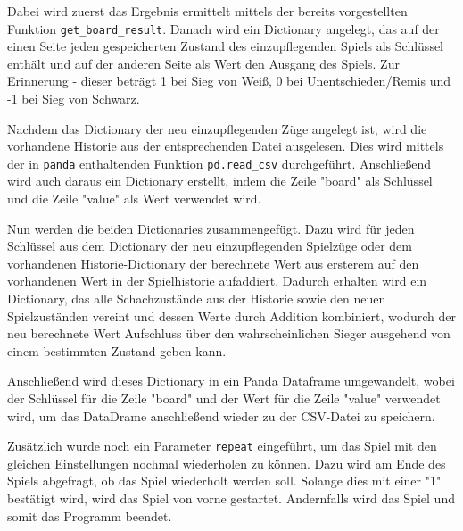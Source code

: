     Dabei wird zuerst das Ergebnis ermittelt mittels der bereits
vorgestellten Funktion \texttt{get\_board\_result}. Danach wird ein
Dictionary angelegt, das auf der einen Seite jeden gespeicherten Zustand
des einzupflegenden Spiels als Schlüssel enthält und auf der anderen
Seite als Wert den Ausgang des Spiels. Zur Erinnerung - dieser beträgt 1
bei Sieg von Weiß, 0 bei Unentschieden/Remis und -1 bei Sieg von Schwarz.

Nachdem das Dictionary der neu einzupflegenden Züge angelegt ist, wird
die vorhandene Historie aus der entsprechenden Datei ausgelesen. Dies
wird mittels der in \texttt{panda} enthaltenden Funktion
\texttt{pd.read\_csv} durchgeführt. Anschließend wird auch daraus ein
Dictionary erstellt, indem die Zeile "board" als Schlüssel und die Zeile
"value" als Wert verwendet wird.

Nun werden die beiden Dictionaries zusammengefügt. Dazu wird für jeden
Schlüssel aus dem Dictionary der neu einzupflegenden Spielzüge oder dem
vorhandenen Historie-Dictionary der berechnete Wert aus ersterem auf den
vorhandenen Wert in der Spielhistorie aufaddiert. Dadurch erhalten wird
ein Dictionary, das alle Schachzustände aus der Historie sowie den neuen
Spielzuständen vereint und dessen Werte durch Addition kombiniert,
wodurch der neu berechnete Wert Aufschluss über den wahrscheinlichen
Sieger ausgehend von einem bestimmten Zustand geben kann.

Anschließend wird dieses Dictionary in ein Panda Dataframe umgewandelt,
wobei der Schlüssel für die Zeile "board" und der Wert für die Zeile
"value" verwendet wird, um das DataDrame anschließend wieder zu der
CSV-Datei zu speichern.

Zusätzlich wurde noch ein Parameter \texttt{repeat} eingeführt, um das
Spiel mit den gleichen Einstellungen nochmal wiederholen zu können. Dazu
wird am Ende des Spiels abgefragt, ob das Spiel wiederholt werden soll.
Solange dies mit einer "1" bestätigt wird, wird das Spiel von vorne
gestartet. Andernfalls wird das Spiel und somit das Programm beendet.

